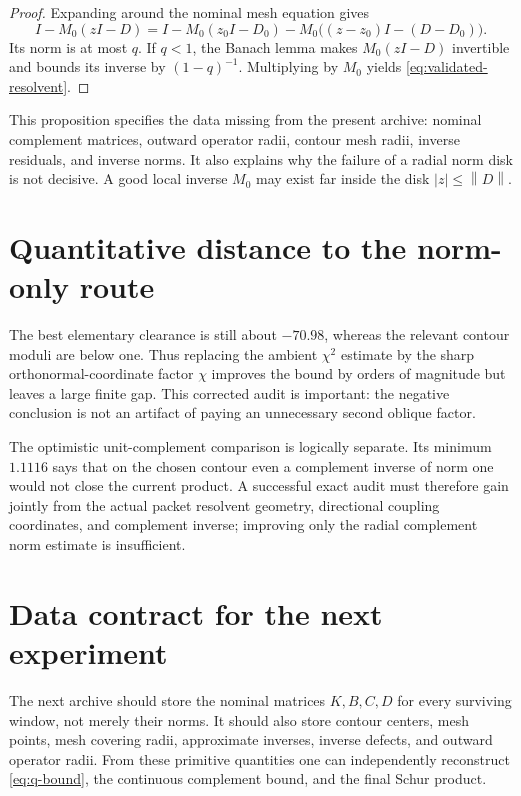 \documentclass[12pt]{article}
\theoremstyle{remark}
\newcommand{\norm}[1]{\left\lVert#1\right\rVert}
\begin{document}
\begin{proof}
Expanding around the nominal mesh equation gives
\[
 I-M_0(zI-D)
 =I-M_0(z_0I-D_0)-M_0\bigl((z-z_0)I-(D-D_0)\bigr).
\]
Its norm is at most $q$.  If $q<1$, the Banach lemma makes
$M_0(zI-D)$ invertible and bounds its inverse by $(1-q)^{-1}$.  Multiplying
by $M_0$ yields \eqref{eq:validated-resolvent}.
\end{proof}

This proposition specifies the data missing from the present archive:
nominal complement matrices, outward operator radii, contour mesh radii,
inverse residuals, and inverse norms.  It also explains why the failure of a
radial norm disk is not decisive.  A good local inverse $M_0$ may exist far
inside the disk $|z|\le\norm D$.

\section{Quantitative distance to the norm-only route}

The best elementary clearance is still about $-70.98$, whereas the relevant
contour moduli are below one.  Thus replacing the ambient $\chi^2$ estimate
by the sharp orthonormal-coordinate factor $\chi$ improves the bound by
orders of magnitude but leaves a large finite gap.  This corrected audit is
important: the negative conclusion is not an artifact of paying an
unnecessary second oblique factor.

The optimistic unit-complement comparison is logically separate.  Its
minimum $1.1116$ says that on the chosen contour even a complement inverse
of norm one would not close the current product.  A successful exact audit
must therefore gain jointly from the actual packet resolvent geometry,
directional coupling coordinates, and complement inverse; improving only
the radial complement norm estimate is insufficient.

\section{Data contract for the next experiment}

The next archive should store the nominal matrices $K,B,C,D$ for every
surviving window, not merely their norms.  It should also store contour
centers, mesh points, mesh covering radii, approximate inverses, inverse
defects, and outward operator radii.  From these primitive quantities one
can independently reconstruct \eqref{eq:q-bound}, the continuous
complement bound, and the final Schur product.
\end{document}
